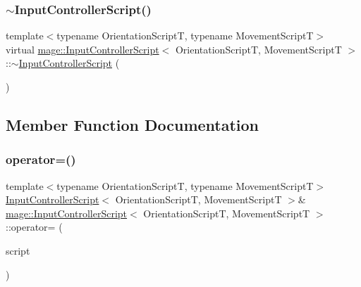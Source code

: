 \subsubsection{\texorpdfstring{$\sim$\+Input\+Controller\+Script()}{~InputControllerScript()}}
{\footnotesize\ttfamily template$<$typename Orientation\+ScriptT, typename Movement\+ScriptT$>$ \\
virtual \hyperlink{classmage_1_1_input_controller_script}{mage\+::\+Input\+Controller\+Script}$<$ Orientation\+ScriptT, Movement\+ScriptT $>$\+::$\sim$\hyperlink{classmage_1_1_input_controller_script}{Input\+Controller\+Script} (\begin{DoxyParamCaption}{ }\end{DoxyParamCaption})\hspace{0.3cm}{\ttfamily [virtual]}}



\subsection{Member Function Documentation}
\hypertarget{classmage_1_1_input_controller_script_a747a0a1cb4064a5b8580195c0a53b887}{}\label{classmage_1_1_input_controller_script_a747a0a1cb4064a5b8580195c0a53b887} 
\subsubsection{\texorpdfstring{operator=()}{operator=()}\hspace{0.1cm}{\footnotesize\ttfamily [1/2]}}
{\footnotesize\ttfamily template$<$typename Orientation\+ScriptT, typename Movement\+ScriptT$>$ \\
\hyperlink{classmage_1_1_input_controller_script}{Input\+Controller\+Script}$<$ Orientation\+ScriptT, Movement\+ScriptT $>$\& \hyperlink{classmage_1_1_input_controller_script}{mage\+::\+Input\+Controller\+Script}$<$ Orientation\+ScriptT, Movement\+ScriptT $>$\+::operator= (\begin{DoxyParamCaption}\item[{const \hyperlink{classmage_1_1_input_controller_script}{Input\+Controller\+Script}$<$ Orientation\+ScriptT, Movement\+ScriptT $>$ \&}]{script }\end{DoxyParamCaption})\hspace{0.3cm}{\ttfamily [delete]}}

